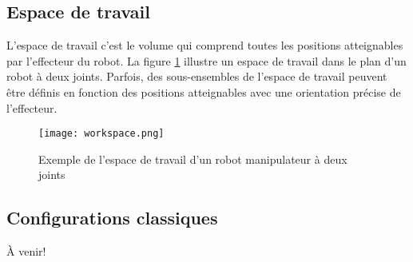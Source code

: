 \subsection{Espace de travail}

L'espace de travail c'est le volume qui comprend toutes les positions atteignables par l'effecteur du robot. La figure \ref{fig:workspace} illustre un espace de travail dans le plan d'un robot à deux joints. Parfois, des sous-ensembles de l'espace de travail peuvent être définis en fonction des positions atteignables avec une orientation précise de l'effecteur.

\begin{figure}[H]
	\centering
	\texttt{[image: workspace.png]}
	\caption{Exemple de l'espace de travail d'un robot manipulateur à deux joints}
	\label{fig:workspace}
\end{figure}







\subsection{Configurations classiques}

À venir!



